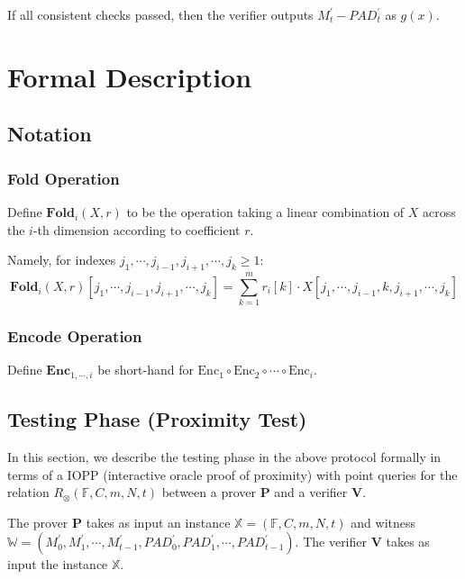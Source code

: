 If all consistent checks passed, then the verifier outputs $M_{t}^{\prime} - PAD_t^\prime$ as $g(x)$.

\section{Formal Description}

\subsection{Notation}

\subsubsection{Fold Operation}

Define $\textbf{Fold}_i(X, r)$ to be the operation taking a linear combination of $X$ across the $i$-th dimension according to coefficient $r$. 

Namely, for indexes $j_1, \cdots, j_{i-1}, j_{i+1}, \cdots , j_{k} \ge 1$:
$$
\textbf{Fold}_i(X, r)[j_1, \cdots, j_{i-1}, j_{i+1}, \cdots , j_{k}] = \sum_{k=1}^{m} r_{i}[k] \cdot X[j_1, \cdots, j_{i-1}, k, j_{i+1}, \cdots , j_{k}]
$$

\subsubsection{Encode Operation}

Define $\textbf{Enc}_{1,\cdots,i}$ be short-hand for $\text{Enc}_1 \circ \text{Enc}_2 \circ \cdots \circ \text{Enc}_{i}$.

\subsection{Testing Phase (Proximity Test)}

In this section, we describe the testing phase in the above protocol formally in terms of a IOPP (interactive oracle proof of proximity) with point queries for the relation $R_\otimes(\mathbb{F}, C, m, N, t)$ between a prover $\textbf{P}$ and a verifier $\textbf{V}$.

The prover $\textbf{P}$ takes as input an instance $\mathbb{X} = (\mathbb{F}, C, m, N, t)$ and witness $\mathbb{W} = (M_0^{\prime}, M_1^{\prime}, \cdots, M_{t-1}^{\prime}, PAD_0^{\prime}, PAD_1^{\prime}, \cdots, PAD_{t-1}^{\prime})$. The verifier $\textbf{V}$ takes as input the instance $\mathbb{X}$.

